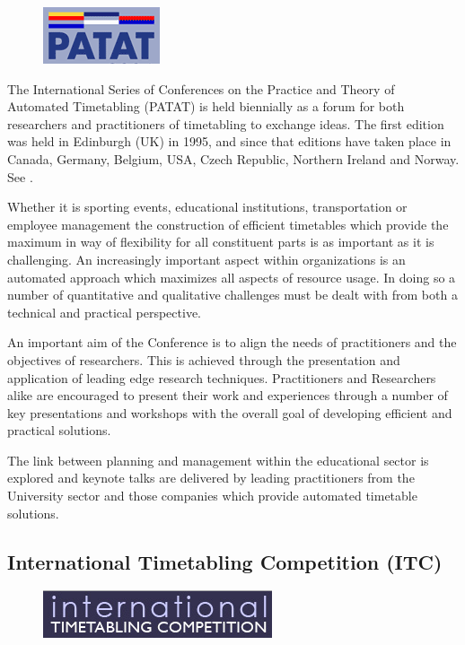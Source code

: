 \begin{figure}[h]
\hfill\includegraphics[scale=0.8]{figures/patat.png}
\end{figure}

The International Series of Conferences on the Practice and Theory of Automated Timetabling (PATAT) is held biennially as a forum for both researchers and practitioners of timetabling to exchange ideas. The first edition was held in Edinburgh (UK) in 1995, and since that editions have taken place in Canada, Germany, Belgium, USA, Czech Republic, Northern Ireland and Norway. See \cite{Patat}.

Whether it is sporting events, educational institutions, transportation or employee management the construction of efficient timetables which provide the maximum in way of flexibility for all constituent parts is as important as it is challenging. An increasingly important aspect within organizations is an automated approach which maximizes all aspects of resource usage. In doing so a number of quantitative and qualitative challenges must be dealt with from both a technical and practical perspective.

An important aim of the Conference is to align the needs of practitioners and the objectives of researchers. This is achieved through the presentation and application of leading edge research techniques. Practitioners and Researchers alike are encouraged to present their work and experiences through a number of key presentations and workshops with the overall goal of developing efficient and practical solutions.

The link between planning and management within the educational sector is explored and keynote talks are delivered by leading practitioners from the University sector and those companies which provide automated timetable solutions.


\subsection{International Timetabling Competition (ITC)}
\label{itc}

\begin{figure}[h]
\hfill\includegraphics[scale=0.8]{figures/itc.png}
\end{figure}


